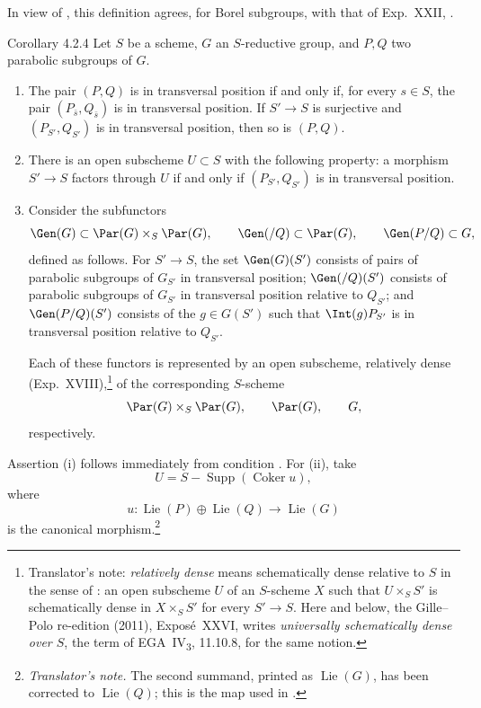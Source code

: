 In view of \textup{}, this definition agrees, for Borel subgroups,
with that of Exp.\ XXII, .

\begin{sgastatement}{Corollary 4.2.4}
Let \(S\) be a scheme, \(G\) an \(S\)-reductive group, and \(P,Q\) two
parabolic subgroups of \(G\).
\begin{enumerate}[label=\textup{(\roman*)}]
\item The pair \((P,Q)\) is in transversal position if and only if, for
every \(s\in S\), the pair \((P_{\bar s},Q_{\bar s})\) is in transversal
position.  If \(S'\to S\) is surjective and
\((P_{S'},Q_{S'})\) is in transversal position, then so is \((P,Q)\).
\item There is an open subscheme \(U\subset S\) with the following
property: a morphism \(S'\to S\) factors through \(U\) if and only if
\((P_{S'},Q_{S'})\) is in transversal position.
\item Consider the subfunctors
\[
 \Gen(G)\subset\Par(G)\times_S\Par(G),\qquad
 \Gen(/Q)\subset\Par(G),\qquad
 \Gen(P/Q)\subset G,
\]
defined as follows.  For \(S'\to S\), the set \(\Gen(G)(S')\) consists
of pairs of parabolic subgroups of \(G_{S'}\) in transversal position;
\(\Gen(/Q)(S')\) consists of parabolic subgroups of \(G_{S'}\) in
transversal position relative to \(Q_{S'}\); and \(\Gen(P/Q)(S')\)
consists of the \(g\in G(S')\) such that \(\Int(g)P_{S'}\) is in
transversal position relative to \(Q_{S'}\).

Each of these functors is represented by an open subscheme,
relatively dense \textup{(Exp.\ XVIII)},\footnote{Translator's note: \emph{relatively dense} means schematically dense
relative to \(S\) in the sense of : an open subscheme \(U\) of
an \(S\)-scheme \(X\) such that \(U\times_SS'\) is schematically dense in
\(X\times_SS'\) for every \(S'\to S\). Here and below, the Gille--Polo
re-edition (2011), Exposé~XXVI, writes \emph{universally schematically dense
over \(S\)}, the term of EGA~IV\textsubscript{3}, 11.10.8, for the same notion.} of the corresponding
\(S\)-scheme
\[
 \Par(G)\times_S\Par(G),\qquad\Par(G),\qquad G,
\]
respectively.
\end{enumerate}
\end{sgastatement}

Assertion \textup{(i)} follows immediately from condition
\textup{}.  For \textup{(ii)}, take
\[
 U=S-\operatorname{Supp}(\operatorname{Coker}u),
\]
where
\[
 u:\operatorname{Lie}(P)\oplus\operatorname{Lie}(Q)
   \longrightarrow\operatorname{Lie}(G)
\]
is the canonical morphism.\footnote{\emph{Translator's note.} The second
summand, printed as \(\operatorname{Lie}(G)\), has been corrected to
\(\operatorname{Lie}(Q)\); this is the map used in \textup{}.}

